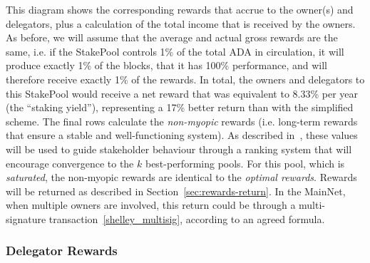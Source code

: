 \documentclass[11pt,a4paper,dvipsnames,twosided,final]{article}
\newcommand{\khcomment}[1]{\todo[color=blue!20]{KH: #1}}
\newcommand{\ada}{ADA{}}
\begin{document}
\noindent
This diagram shows the corresponding rewards that accrue to the owner(s) and delegators,
plus a calculation of the total income that is received by the owners.  As before, we will assume that the average
and actual gross rewards are the same, i.e. if the StakePool controls 1\% of the total \ada{} in
circulation, it will produce exactly 1\% of the blocks, that it has 100\% performance, and will therefore receive exactly 1\% of the rewards.
In total, the
owners and delegators to this StakePool would receive a net reward that was equivalent to 8.33\% per year
(the ``staking yield''), representing a 17\% better return than with the simplified scheme.
The final rows calculate the \emph{non-myopic} rewards (i.e. long-term rewards that ensure
a stable and well-functioning system).  As described in~\cite{SL-D1}, these values will be used to guide stakeholder behaviour
through a ranking system that will encourage convergence to the $k$ best-performing pools.
For this pool, which is \emph{saturated}, the non-myopic rewards are identical to the \emph{optimal rewards}.
\khcomment{Is this always the case?}
Rewards will be returned as described in Section~\ref{sec:rewards-return}.  In the MainNet, when multiple
owners are involved, this return could be through a multi-signature transaction~\ref{shelley_multisig}, according to an agreed
formula.

\subsubsection*{Delegator Rewards}
\end{document}
